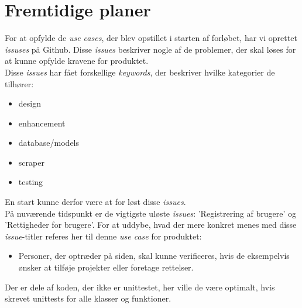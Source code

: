 \documentclass[11pt]{article}
\begin{document}
\section{Fremtidige planer}
For at opfylde de \textit{use cases}, der blev opstillet i starten af forløbet, har vi oprettet \textit{issuses} på Github. Disse \textit{issues} beskriver nogle af de problemer, der skal løses for at kunne opfylde kravene for produktet. \\
Disse \textit{issues} har fået forskellige \textit{keywords}, der beskriver hvilke kategorier de tilhører:
\begin{itemize}
	\item{design}
	\item{enhancement}
	\item{database/models}
	\item{scraper}
	\item{testing}
\end{itemize}
En start kunne derfor være at for løst disse \textit{issues}. \\
På nuværende tidspunkt er de vigtigste uløste \textit{issues}: 'Registrering af brugere' og 'Rettigheder for brugere'. For at uddybe, hvad der mere konkret menes med disse \textit{issue}-titler referes her til denne \textit{use case} for produktet:
\begin{itemize}
 \item[]{Personer, der optræder på siden, skal kunne verificeres, hvis de eksempelvis ønsker at tilføje projekter eller foretage rettelser.}
\end{itemize}
Der er dele af koden, der ikke er unittestet, her ville de være optimalt, hvis skrevet unittests for alle klasser og funktioner.
\end{document}
